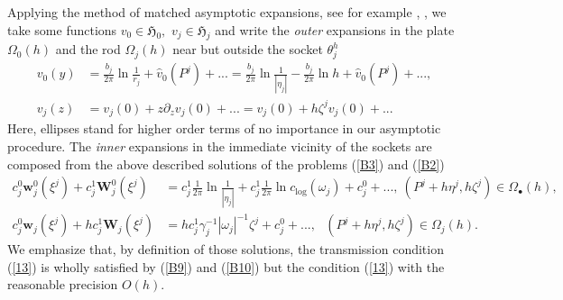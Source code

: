 \documentclass[11pt]{article}%
\numberwithin{equation}{section}
\begin{document}
Applying the method of matched asymptotic expansions, see for example
\cite{VanDyke, Ilin}, \cite[Ch. 2]{MaNaPl}, we take some functions $v_{0}%
\in\mathfrak{H}_{0},$ $v_{j}\in\mathfrak{H}_{j}$ and write the \textit{outer}
expansions in the plate $\Omega_{0}(h)$ and the rod $\Omega_{j}(h)$ near but
outside the socket $\theta_{j}^{h}$%
\begin{align}
v_{0}(y)  &  =\frac{b_{j}}{2\pi}\ln\frac{1}{r_{j}}+\widehat{v}_{0}%
(P^{j})+...=\frac{b_{j}}{2\pi}\ln\frac{1}{|\eta_{j}|}-\frac{b_{j}}{2\pi}\ln
h+\widehat{v}_{0}(P^{j})+...,\label{B7}\\
v_{j}(z)  &  =v_{j}(0)+z\partial_{z}v_{j}(0)+...=v_{j}(0)+h\zeta^{j}%
v_{j}(0)+... \label{B8}%
\end{align}
Here, ellipses stand for higher order terms of no importance in our asymptotic
procedure. The \textit{inner} expansions in the immediate vicinity of the
sockets are composed from the above described solutions of the problems
(\ref{B3}) and (\ref{B2})%
\begin{align}
c_{j}^{0}\mathbf{w}_{j}^{0}(\xi^{j})+c_{j}^{1}\mathbf{W}_{j}^{0}(\xi^{j})  &
=c_{j}^{1}\frac{1}{2\pi}\ln\frac{1}{|\eta_{j}|}+c_{j}^{1}\frac{1}{2\pi}\ln
c_{\log}\left(  \omega_{j}\right)  +c_{j}^{0}+...,\ (P^{j}+h\eta^{j}%
,h\zeta^{j})\in\Omega_{\bullet}(h),\label{B9}\\
c_{j}^{0}\mathbf{w}_{j}(\xi^{j})+hc_{j}^{1}\mathbf{W}_{j}(\xi^{j})  &
=hc_{j}^{1}\gamma_{j}^{-1}|\omega_{j}|^{-1}\zeta^{j}+c_{j}^{0}%
+...,\ \ \ (P^{j}+h\eta^{j},h\zeta^{j})\in\Omega_{j}(h). \label{B10}%
\end{align}
We emphasize that, by definition of those solutions, the transmission
condition (\ref{13}) is wholly satisfied by (\ref{B9}) and (\ref{B10}) but the
condition (\ref{13}) with the reasonable precision $O(h).$
\end{document}
